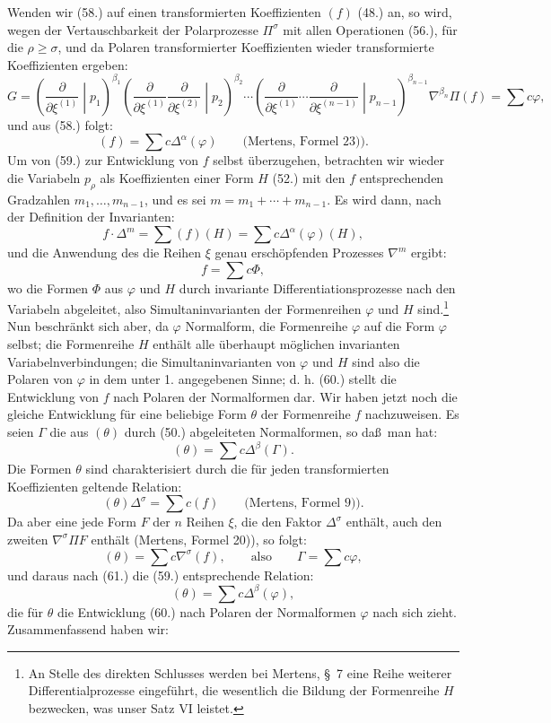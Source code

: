 \documentclass[11pt]{article}
\begin{document}
Wenden wir (58.) auf einen transformierten Koeffizienten $(f)$ (48.) an, so wird, wegen der Vertauschbarkeit der Polarprozesse $\Pi^\sigma$ mit allen Operationen (56.), f\"ur die $\rho\ge\sigma$, und da Polaren transformierter Koeffizienten wieder transformierte Koeffizienten ergeben:
\[
 G=\left(\frac{\partial}{\partial\xi^{(1)}}\middle|p_1\right)^{\beta_1}
 \left(\frac{\partial}{\partial\xi^{(1)}}\frac{\partial}{\partial\xi^{(2)}}\middle|p_2\right)^{\beta_2}
 \cdots
 \left(\frac{\partial}{\partial\xi^{(1)}}\cdots\frac{\partial}{\partial\xi^{(n-1)}}\middle|p_{n-1}\right)^{\beta_{n-1}}
 \nabla^{\beta_n}\Pi(f)=\sum c\varphi,
\]
und aus (58.) folgt:
\begin{equation}
 (f)=\sum c\Delta^\alpha(\varphi)\qquad\text{(Mertens, Formel 23)).}
\tag{59}
\end{equation}
Um von (59.) zur Entwicklung von $f$ selbst \"uberzugehen, betrachten wir wieder die Variabeln $p_\rho$ als Koeffizienten einer Form $H$ (52.) mit den $f$ entsprechenden Gradzahlen $m_1,\ldots,m_{n-1}$, und es sei $m=m_1+\cdots+m_{n-1}$. Es wird dann, nach der Definition der Invarianten:
\[
 f\cdot\Delta^m=\sum(f)(H)=\sum c\Delta^\alpha(\varphi)(H),
\]
und die Anwendung des die Reihen $\xi$ genau ersch\"opfenden Prozesses $\nabla^m$ ergibt:
\begin{equation}
 f=\sum c\Phi,
\tag{60}
\end{equation}
wo die Formen $\Phi$ aus $\varphi$ und $H$ durch invariante Differentiationsprozesse nach den Variabeln abgeleitet, also Simultaninvarianten der Formenreihen $\varphi$ und $H$ sind.\footnote{An Stelle des direkten Schlusses werden bei Mertens, \S\ 7 eine Reihe weiterer Differentialprozesse eingef\"uhrt, die wesentlich die Bildung der Formenreihe $H$ bezwecken, was unser Satz VI leistet.} Nun beschr\"ankt sich aber, da $\varphi$ Normalform, die Formenreihe $\varphi$ auf die Form $\varphi$ selbst; die Formenreihe $H$ enth\"alt alle \"uberhaupt m\"oglichen invarianten Variabelnverbindungen; die Simultaninvarianten von $\varphi$ und $H$ sind also die Polaren von $\varphi$ in dem unter 1. angegebenen Sinne; d. h. (60.) stellt die Entwicklung von $f$ nach Polaren der Normalformen dar. Wir haben jetzt noch die gleiche Entwicklung f\"ur eine beliebige Form $\theta$ der Formenreihe $f$ nachzuweisen. Es seien $\Gamma$ die aus $(\theta)$ durch (50.) abgeleiteten Normalformen, so da\ss\ man hat:
\begin{equation}
 (\theta)=\sum c\Delta^\beta(\Gamma).
\tag{61}
\end{equation}
Die Formen $\theta$ sind charakterisiert durch die f\"ur jeden transformierten Koeffizienten geltende Relation:
\[
 (\theta)\Delta^\sigma=\sum c(f)\qquad\text{(Mertens, Formel 9)).}
\]
Da aber eine jede Form $F$ der $n$ Reihen $\xi$, die den Faktor $\Delta^\sigma$ enth\"alt, auch den zweiten $\nabla^\sigma\Pi F$ enth\"alt (Mertens, Formel 20)), so folgt:
\[
 (\theta)=\sum c\nabla^\sigma(f),\qquad\text{also}\qquad \Gamma=\sum c\varphi,
\]
und daraus nach (61.) die (59.) entsprechende Relation:
\[
 (\theta)=\sum c\Delta^\beta(\varphi),
\]
die f\"ur $\theta$ die Entwicklung (60.) nach Polaren der Normalformen $\varphi$ nach sich zieht. Zusammenfassend haben wir:
\end{document}

